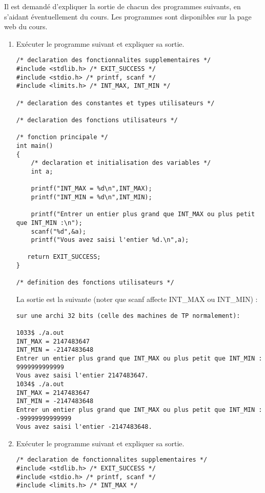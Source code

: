 Il est demandé d'expliquer la sortie de chacun des programmes suivants, en s'aidant éventuellement du cours. Les programmes sont disponibles sur la page web du cours. 
\begin{enumerate}
\item Exécuter le programme suivant et expliquer sa sortie.
\begin{small}
\begin{verbatim}
/* declaration des fonctionnalites supplementaires */
#include <stdlib.h> /* EXIT_SUCCESS */
#include <stdio.h> /* printf, scanf */
#include <limits.h> /* INT_MAX, INT_MIN */

/* declaration des constantes et types utilisateurs */

/* declaration des fonctions utilisateurs */

/* fonction principale */
int main()
{
    /* declaration et initialisation des variables */
    int a;

    printf("INT_MAX = %d\n",INT_MAX);
    printf("INT_MIN = %d\n",INT_MIN);

    printf("Entrer un entier plus grand que INT_MAX ou plus petit que INT_MIN :\n");
    scanf("%d",&a);
    printf("Vous avez saisi l'entier %d.\n",a);

   return EXIT_SUCCESS;
}

/* definition des fonctions utilisateurs */
\end{verbatim}
\end{small}
  \begin{correction}
    La sortie est la suivante (noter que scanf affecte INT\_MAX ou INT\_MIN) :
\begin{verbatim}
sur une archi 32 bits (celle des machines de TP normalement):

1033$ ./a.out
INT_MAX = 2147483647
INT_MIN = -2147483648
Entrer un entier plus grand que INT_MAX ou plus petit que INT_MIN :
9999999999999
Vous avez saisi l'entier 2147483647.
1034$ ./a.out
INT_MAX = 2147483647
INT_MIN = -2147483648
Entrer un entier plus grand que INT_MAX ou plus petit que INT_MIN :
-99999999999999
Vous avez saisi l'entier -2147483648.
\end{verbatim}
  \end{correction}
\item Exécuter le programme suivant et expliquer sa sortie.
\begin{small}
\begin{verbatim}
/* declaration de fonctionnalites supplementaires */
#include <stdlib.h> /* EXIT_SUCCESS */
#include <stdio.h> /* printf, scanf */
#include <limits.h> /* INT_MAX */


\end{verbatim}
\end{small}
\end{enumerate}
